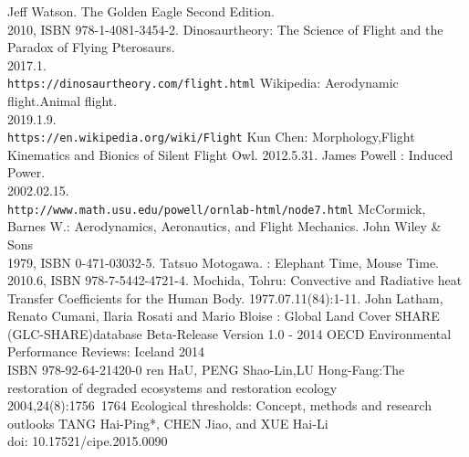 \documentclass[12pt]{article}
\begin{document}
\begin{thebibliography}{99}
Jeff Watson. The Golden Eagle Second Edition. \\ 2010, ISBN 978-1-4081-3454-2.
Dinosaurtheory: The Science of Flight and the Paradox of Flying Pterosaurs.\\ 2017.1. \texttt{\\https://dinosaurtheory.com/flight.html}
Wikipedia: Aerodynamic flight.Animal flight.\\ 2019.1.9. \texttt{\\https://en.wikipedia.org/wiki/Flight}
Kun Chen: Morphology,Flight Kinematics and Bionics of Silent Flight Owl. 2012.5.31.
James Powell : Induced Power.\\ 2002.02.15. \texttt{\\http://www.math.usu.edu/powell/ornlab-html/node7.html}
McCormick, Barnes W.: Aerodynamics, Aeronautics, and Flight Mechanics.  John Wiley \& Sons\\ 1979, ISBN 0-471-03032-5.
Tatsuo Motogawa. : Elephant Time, Mouse Time.\\2010.6, ISBN 978-7-5442-4721-4.
Mochida, Tohru: Convective and Radiative heat Transfer Coefficients for the Human Body. 1977.07.11(84):1-11.
John Latham, Renato Cumani, Ilaria Rosati and Mario Bloise : Global Land Cover SHARE (GLC-SHARE)database Beta-Release Version 1.0 - 2014
OECD Environmental Performance Reviews: Iceland 2014 \\ISBN 978-92-64-21420-0
ren HaU, PENG Shao-Lin,LU Hong-Fang:The restoration of degraded ecosystems and restoration ecology \\2004,24(8):1756~1764
Ecological thresholds: Concept, methods and research outlooks TANG Hai-Ping*, CHEN Jiao, and XUE Hai-Li  \\doi: 10.17521/cipe.2015.0090 \\\\\\\\\\\\

\end{thebibliography}
\end{document}
